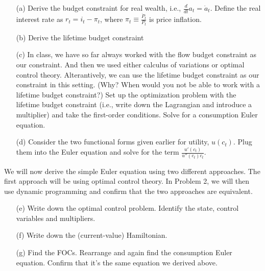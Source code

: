\documentclass[11pt]{extarticle}
\theoremstyle{plain}
\theoremstyle{definition}
\begin{document}
\vspace{5mm}
\begin{enumerate}
\item [(a)] Derive the budget constraint for real wealth, i.e., $\frac{d}{dt} a_t = \dot a_t$. Define the real interest rate as $r_t = i_t - \pi_t$, where $\pi_t \equiv \frac{\dot P_t}{P_t}$ is price inflation.
	
\item [(b)] Derive the lifetime budget constraint
	
\item [(c)] In class, we have so far always worked with the flow budget constraint as our constraint. And then we used either calculus of variations or optimal control theory. Alterantively, we can use the lifetime budget constraint as our constraint in this setting. (Why? When would you not be able to work with a lifetime budget constraint?) Set up the optimization problem with the lifetime budget constraint (i.e., write down the Lagrangian and introduce a multiplier) and take the first-order conditions. Solve for a consumption Euler equation. 
	
\item [(d)] Consider the two functional forms given earlier for utility, $u(c_t)$. Plug them into the Euler equation and solve for the term $\frac{u'(c_t)}{ u''(c_t) c_t}$.
\end{enumerate}


\vspace{6mm}
\noindent
We will now derive the simple Euler equation using two different approaches. The first approach will be using optimal control theory. In Problem 2, we will then use dynamic programming and confirm that the two approaches are equivalent.

\vspace{5mm}
\begin{enumerate}
\item [(e)] Write down the optimal control problem. Identify the state, control variables and multipliers.
	
\item [(f)] Write down the (current-value) Hamiltonian.
	
\item [(g)] Find the FOCs. Rearrange and again find the consumption Euler equation. Confirm that it's the same equation we derived above. 
\end{enumerate}



\vspace{5mm}
\end{document}
